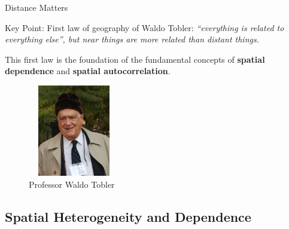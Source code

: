 \documentclass[english,10pt]{beamer}\usepackage[]{graphicx}\usepackage[]{xcolor}
\begin{document}
\begin{frame}{Distance Matters}
\begin{alertblock}{Key Point:}
First law of geography of Waldo Tobler: \emph{``everything is related to everything else'', but near things are more related than distant things.}
\end{alertblock}

This first law is the foundation of the fundamental concepts of \textbf{spatial dependence} and \textbf{spatial autocorrelation}.

\begin{figure}
	\caption{Professor Waldo Tobler}
\centering
	\includegraphics[width=4cm, height=4cm]{Waldo_Tobler}
\end{figure}

\end{frame}

\subsection{Spatial Heterogeneity and Dependence}
\end{document}
